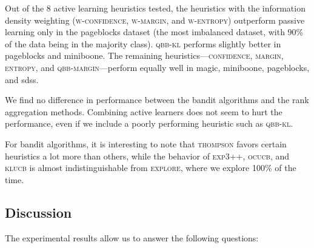 \documentclass[fleqn,10pt,lineno]{wlpeerj} %
\begin{document}
Out of the 8 active learning heuristics tested, the heuristics with the
information density weighting (\textsc{w-confidence},
\textsc{w-margin}, and \textsc{w-entropy}) outperform passive learning only in
the pageblocks dataset (the most imbalanced dataset, with 90\% of the data
being in the majority class). \textsc{qbb-kl} performs slightly better in
pageblocks and miniboone. The remaining heuristics---\textsc{confidence},
\textsc{margin}, \textsc{entropy}, and \textsc{qbb-margin}---perform equally
well in magic, miniboone, pageblocks, and sdss.

We find no difference in performance between the bandit algorithms and
the rank aggregation methods. Combining active learners does not seem
to hurt the performance, even if we include a poorly performing heuristic
such as \textsc{qbb-kl}.

For bandit algorithms, it is interesting to note that \textsc{thompson}
favors certain heuristics a lot more than others, while the behavior of
\textsc{exp3++}, \textsc{ocucb}, and \textsc{klucb} is almost indistinguishable
from \textsc{explore}, where we explore 100\% of the time.

\subsection{Discussion}

The experimental results allow us to answer the following questions:
\end{document}
